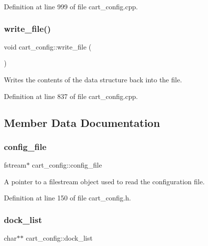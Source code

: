 Definition at line 999 of file cart\+\_\+config.\+cpp.

\mbox{\label{classcart__config_afda8f2022ce8e2bb9a79f99cadad670c}} 
\subsubsection{\texorpdfstring{write\+\_\+file()}{write\_file()}}
{\footnotesize\ttfamily void cart\+\_\+config\+::write\+\_\+file (\begin{DoxyParamCaption}{ }\end{DoxyParamCaption})}

Writes the contents of the data structure back into the file. 

Definition at line 837 of file cart\+\_\+config.\+cpp.



\subsection{Member Data Documentation}
\mbox{\label{classcart__config_a471d3cd9fe8d8722e43194c55a45e976}} 
\subsubsection{\texorpdfstring{config\+\_\+file}{config\_file}}
{\footnotesize\ttfamily fstream$\ast$ cart\+\_\+config\+::config\+\_\+file\hspace{0.3cm}{\ttfamily [private]}}

A pointer to a filestream object used to read the configuration file. 

Definition at line 150 of file cart\+\_\+config.\+h.

\mbox{\label{classcart__config_a3b73d8e5b48ba87502d77028ec765023}} 
\subsubsection{\texorpdfstring{dock\+\_\+list}{dock\_list}}
{\footnotesize\ttfamily char$\ast$$\ast$ cart\+\_\+config\+::dock\+\_\+list\hspace{0.3cm}{\ttfamily [private]}}

